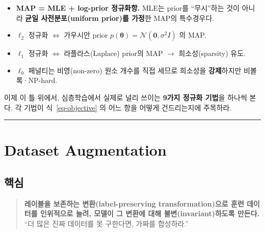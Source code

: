 \documentclass[
  letterpaper,
  DIV=11,
  numbers=noendperiod]{scrreprt}
\providecommand{\tightlist}{%
  \setlength{\itemsep}{0pt}\setlength{\parskip}{0pt}}
\begin{document}
\begin{tcolorbox}[enhanced jigsaw, arc=.35mm, bottomrule=.15mm, bottomtitle=1mm, breakable, colback=white, colbacktitle=quarto-callout-important-color!10!white, colframe=quarto-callout-important-color-frame, coltitle=black, left=2mm, leftrule=.75mm, opacityback=0, opacitybacktitle=0.6, rightrule=.15mm, title=\textcolor{quarto-callout-important-color}{\faExclamation}\hspace{0.5em}{정확한 진술 (자주 틀리는 부분)}, titlerule=0mm, toprule=.15mm, toptitle=1mm]

\begin{itemize}
\tightlist
\item
  \textbf{MAP = MLE + log-prior 정규화항.} MLE는 prior를 ``무시''하는
  것이 아니라 \textbf{균일 사전분포(uniform prior)를 가정}한 MAP의
  특수경우다.
\item
  \(\ell_2\) 정규화 \(\Leftrightarrow\) 가우시안 prior
  \(p(\bm{\theta})=\mathcal{N}(\bm{0},\sigma^2 I)\) 의 MAP.
\item
  \(\ell_1\) 정규화 \(\Leftrightarrow\) 라플라스(Laplace) prior의 MAP
  \(\to\) 희소성(sparsity) 유도.
\item
  \(\ell_0\) 페널티는 비영(non-zero) 원소 개수를 직접 세므로 희소성을
  \textbf{강제}하지만 비볼록·NP-hard.
\end{itemize}

\end{tcolorbox}

이제 이 틀 위에서, 심층학습에서 실제로 널리 쓰이는 \textbf{9가지 정규화
기법}을 하나씩 본다. 각 기법이 식~\ref{eq-objective} 의 어느 항을 어떻게
건드리는지에 주목하라.

\begin{center}\rule{0.5\linewidth}{0.5pt}\end{center}

\chapter{Dataset Augmentation}\label{sec-augment}

\section{핵심}\label{uxd575uxc2ec}

\begin{quote}
\textbf{레이블을 보존하는 변환(label-preserving transformation)으로 훈련
데이터를 인위적으로 늘려, 모델이 그 변환에 대해 불변(invariant)하도록
만든다.} ``더 많은 진짜 데이터를 못 구한다면, 가짜를 합성하라.''
\end{quote}
\end{document}
